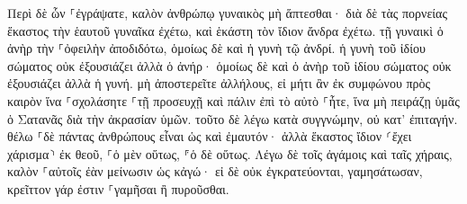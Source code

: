 \documentclass{openreader}
\begin{document}
Περὶ δὲ ὧν ⸀ἐγράψατε, καλὸν ἀνθρώπῳ γυναικὸς μὴ ἅπτεσθαι· 
διὰ δὲ τὰς πορνείας ἕκαστος τὴν ἑαυτοῦ γυναῖκα ἐχέτω, καὶ ἑκάστη τὸν ἴδιον ἄνδρα ἐχέτω. 
τῇ γυναικὶ ὁ ἀνὴρ τὴν ⸀ὀφειλὴν ἀποδιδότω, ὁμοίως δὲ καὶ ἡ γυνὴ τῷ ἀνδρί. 
ἡ γυνὴ τοῦ ἰδίου σώματος οὐκ ἐξουσιάζει ἀλλὰ ὁ ἀνήρ· ὁμοίως δὲ καὶ ὁ ἀνὴρ τοῦ ἰδίου σώματος οὐκ ἐξουσιάζει ἀλλὰ ἡ γυνή. 
μὴ ἀποστερεῖτε ἀλλήλους, εἰ μήτι ἂν ἐκ συμφώνου πρὸς καιρὸν ἵνα ⸀σχολάσητε ⸀τῇ προσευχῇ καὶ πάλιν ἐπὶ τὸ αὐτὸ ⸀ἦτε, ἵνα μὴ πειράζῃ ὑμᾶς ὁ Σατανᾶς διὰ τὴν ἀκρασίαν ὑμῶν. 
τοῦτο δὲ λέγω κατὰ συγγνώμην, οὐ κατ’ ἐπιταγήν. 
θέλω ⸀δὲ πάντας ἀνθρώπους εἶναι ὡς καὶ ἐμαυτόν· ἀλλὰ ἕκαστος ἴδιον ⸂ἔχει χάρισμα⸃ ἐκ θεοῦ, ⸀ὁ μὲν οὕτως, ⸁ὁ δὲ οὕτως. 
Λέγω δὲ τοῖς ἀγάμοις καὶ ταῖς χήραις, καλὸν ⸀αὐτοῖς ἐὰν μείνωσιν ὡς κἀγώ· 
εἰ δὲ οὐκ ἐγκρατεύονται, γαμησάτωσαν, κρεῖττον γάρ ἐστιν ⸀γαμῆσαι ἢ πυροῦσθαι. 
\end{document}
